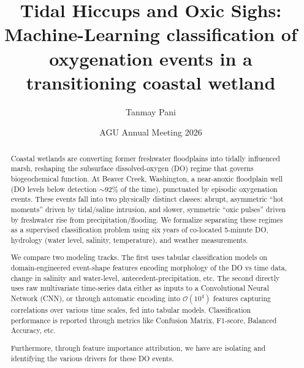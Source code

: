 \documentclass[11pt]{article}
\title{Tidal Hiccups and Oxic Sighs: Machine-Learning classification of
oxygenation events in a transitioning coastal wetland}
\author{Tanmay Pani}
\date{AGU Annual Meeting 2026}
\begin{document}
\maketitle

\begin{abstract}
Coastal wetlands are converting former freshwater floodplains into tidally
influenced marsh, reshaping the subsurface dissolved-oxygen (DO) regime that
governs biogeochemical function. At Beaver Creek, Washington, a near-anoxic
floodplain well (DO levels below detection $\sim$92\% of the time), punctuated by
episodic oxygenation events. These events fall into two physically distinct
classes: abrupt, asymmetric ``hot moments'' driven by tidal/saline intrusion, and
slower, symmetric ``oxic pulses'' driven by freshwater rise from precipitation/flooding. 
We formalize separating these regimes as a supervised
classification problem using six years of co-located 5-minute DO, hydrology
(water level, salinity, temperature), and weather measurements.

We compare two modeling tracks. The first uses tabular classification models on domain-engineered event-shape features encoding morphology of the DO vs time data, change in salinity and water-level,
antecedent-precipitation, etc. The second directly uses raw multivariate time-series data either as inputs to a Convolutional Neural Network (CNN), or through automatic encoding into \(\mathcal{O}(10^4)\) features capturing correlations over various time scales, fed into tabular models. Classification performance is reported through metrics like Confusion Matrix, F1-score, Balanced Accuracy, etc.

Furthermore, through feature importance attribution, we have are isolating and identifying the various drivers for these DO events.
\end{abstract}
\end{document}
